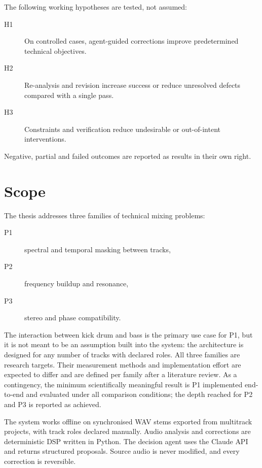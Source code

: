 The following working hypotheses are tested, not assumed:

\begin{description}
	\item[H1] On controlled cases, agent-guided corrections improve predetermined technical objectives.
	\item[H2] Re-analysis and revision increase success or reduce unresolved defects compared with a single pass.
	\item[H3] Constraints and verification reduce undesirable or out-of-intent interventions.
\end{description}

Negative, partial and failed outcomes are reported as results in their own right.

\section{Scope}
\label{sec:intro-scope}

The thesis addresses three families of technical mixing problems:

\begin{description}
	\item[P1] spectral and temporal masking between tracks,
	\item[P2] frequency buildup and resonance,
	\item[P3] stereo and phase compatibility.
\end{description}

The interaction between kick drum and bass is the primary use case for P1, but it is not meant to be an assumption built into the system: the architecture is designed for any number of tracks with declared roles.  All three families are research targets. Their measurement methods and implementation effort are expected to differ and are defined per family after a literature review. As a contingency, the minimum scientifically meaningful result is P1 implemented end-to-end and evaluated under all comparison conditions; the depth reached for P2 and P3 is reported as achieved.

The system works offline on synchronised \ac{WAV} stems exported from multitrack projects, with track roles declared manually. Audio analysis and corrections are deterministic \ac{DSP} written in Python. The decision agent uses the Claude \ac{API} and returns structured proposals. Source audio is never modified, and every correction is reversible.

